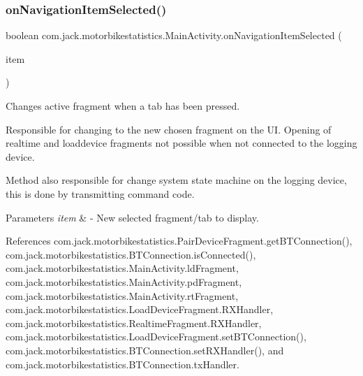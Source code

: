 \subsubsection{\texorpdfstring{on\+Navigation\+Item\+Selected()}{onNavigationItemSelected()}}
{\footnotesize\ttfamily boolean com.\+jack.\+motorbikestatistics.\+Main\+Activity.\+on\+Navigation\+Item\+Selected (\begin{DoxyParamCaption}\item[{Menu\+Item}]{item }\end{DoxyParamCaption})\hspace{0.3cm}{\ttfamily [inline]}}



Changes active fragment when a tab has been pressed. 

Responsible for changing to the new chosen fragment on the UI. Opening of realtime and loaddevice fragments not possible when not connected to the logging device.

Method also responsible for change system state machine on the logging device, this is done by transmitting command code.


\begin{DoxyParams}{Parameters}
{\em item} & -\/ New selected fragment/tab to display. \\
\hline
\end{DoxyParams}


References com.\+jack.\+motorbikestatistics.\+Pair\+Device\+Fragment.\+get\+B\+T\+Connection(), com.\+jack.\+motorbikestatistics.\+B\+T\+Connection.\+is\+Connected(), com.\+jack.\+motorbikestatistics.\+Main\+Activity.\+ld\+Fragment, com.\+jack.\+motorbikestatistics.\+Main\+Activity.\+pd\+Fragment, com.\+jack.\+motorbikestatistics.\+Main\+Activity.\+rt\+Fragment, com.\+jack.\+motorbikestatistics.\+Load\+Device\+Fragment.\+R\+X\+Handler, com.\+jack.\+motorbikestatistics.\+Realtime\+Fragment.\+R\+X\+Handler, com.\+jack.\+motorbikestatistics.\+Load\+Device\+Fragment.\+set\+B\+T\+Connection(), com.\+jack.\+motorbikestatistics.\+B\+T\+Connection.\+set\+R\+X\+Handler(), and com.\+jack.\+motorbikestatistics.\+B\+T\+Connection.\+tx\+Handler.


